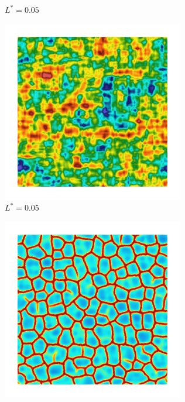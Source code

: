 \begin{figure}[!htbp]
\begin{subfigure}[b]{0.15\textwidth}
    \caption{$L^* = 0.05$}
    \label{fig: Chapter4/2D/Gc_exp_cartesian_5_5_rho_0_seed_b}
  \end{subfigure}
  \begin{subfigure}[b]{0.15\textwidth}
    \includegraphics[width=\textwidth]{Chapter4/figures/2D/psic_exp_cartesian_5_5_rho_0_seed_b.png}
    \caption{$L^* = 0.05$}
    \label{fig: Chapter4/2D/psic_exp_cartesian_5_5_rho_0_seed_b}
  \end{subfigure}
  \begin{subfigure}[b]{0.15\textwidth}
    \includegraphics[width=\textwidth]{Chapter4/figures/2D/d_exp_cartesian_5_5_rho_0_seed_b.png}
    \caption{}
    \label{fig: Chapter4/2D/d_exp_cartesian_5_5_rho_0_seed_b}
  \end{subfigure}


\end{figure}
